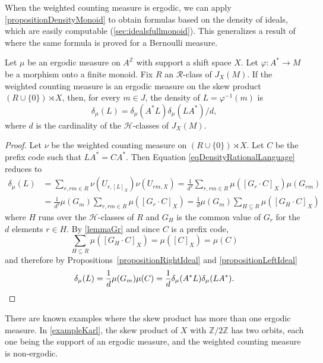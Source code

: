 \documentclass[a4paper,UKenglish,numberwithinsect,cleveref]{lipics-v2021}
\newcommand{\HH}{\mathrel{\mathscr{H}}}
\newcommand{\RR}{\mathrel{\mathscr{R}}}
\newcommand{\Z}{\mathbb{Z}}
\begin{document}
When the weighted counting measure is ergodic, we can apply
\cref{propositionDensityMonoid} to obtain formulas based on the density of ideals, which are easily computable (\cref{sec:idealsfullmonoid}). This generalizes a result of \cite{BerstelPerrinReutenauer2009} where the same formula is proved for a Bernoulli measure. 
\begin{theorem}\label{theoremWeightedCountingMeasure}
 Let $\mu$ be an ergodic measure on $A^\Z$ with support a shift space $X$. Let $\varphi\colon A^*\to M$ be a morphism onto a finite monoid.  Fix $R$ an $\RR$-class of $J_X(M)$.  If the weighted counting measure is an ergodic measure on the skew product $(R\cup\{0\})\rtimes X$, then, for every $m\in J$, the density of $L=\varphi^{-1}(m)$ is
  \begin{equation}
   \delta_\mu(L)=\delta_\mu(A^*L)\delta_\mu(LA^*)/d,\label{eqDensity}
  \end{equation}
    where $d$ is the cardinality of the $\HH$-classes of $J_X(M)$.
\end{theorem}

\begin{proof}
    Let $\nu$ be the weighted counting measure on $(R\cup\{0\})\rtimes X$. Let $C$ be the prefix code such that $LA^*=CA^*$. Then Equation \eqref{eqDensityRationalLanguage} reduces to
    \begin{align*}
      \delta_\mu(L)&=\sum_{r, rm\in R}\nu(U_{r,[L]_X})\nu(U_{rm,X})
            =\frac{1}{d^2}\sum_{r, rm\in R}\mu([G_r \cdot C]_X)\mu(G_{rm})\\
            &=\frac{1}{d^2}\mu(G_m)\sum_{r, rm\in R}\mu([G_r \cdot C]_X)
            =\frac{1}{d}\mu(G_m)\sum_{H\subseteq R}\mu([G_H  \cdot C]_X)
    \end{align*}
    where $H$ runs over the $\HH$-classes of $R$ and $G_H$ is the common value of $G_r$ for the $d$ elements $r\in H$. By \cref{lemmaGr} and since $C$ is a prefix code,
    \[
        \sum_{H\subseteq R}\mu([G_H \cdot C]_X)=\mu([C]_X) = \mu(C)
    \]
    and therefore by Propositions~\ref{propositionRightIdeal} and \ref{propositionLeftIdeal}
    \[
        \delta_\mu(L)=\frac{1}{d}\mu(G_{m})\mu(C)=\frac{1}{d}\delta_\mu(A^*L)\delta_\mu(LA^*).\qedhere
    \]
\end{proof}

There are known examples where the skew product has more than one ergodic measure. In \cref{exampleKarl}, the skew product of $X$ with $\Z/2\Z$ has two orbits, each one being the support of an ergodic measure, and the weighted counting measure is non-ergodic.
\end{document}
